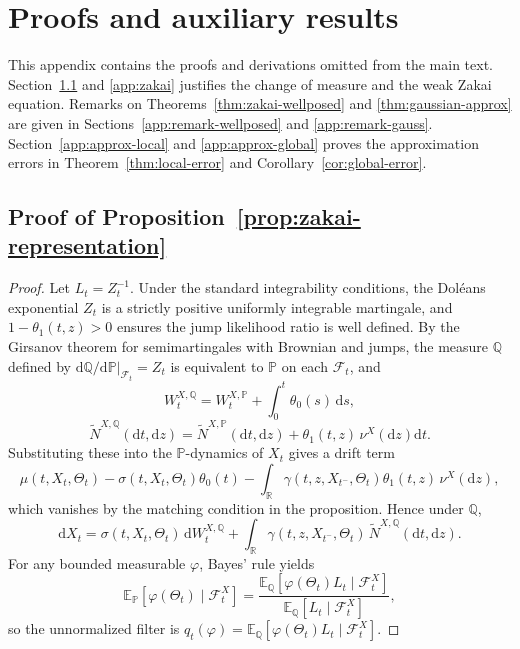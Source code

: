 \documentclass{article}
\newcommand{\dd}{\mathrm{d}}
\begin{document}



\newpage
\appendix

\section{Proofs and auxiliary results}\label{app:proof}

This appendix contains the proofs and derivations omitted from the main text. Section~\ref{app:change-measure} and \ref{app:zakai} justifies the change of measure and the weak Zakai equation. Remarks on Theorems~\ref{thm:zakai-wellposed} and \ref{thm:gaussian-approx} are given in Sections~\ref{app:remark-wellposed} and \ref{app:remark-gauss}. Section~\ref{app:approx-local} and \ref{app:approx-global} proves the approximation errors in Theorem~\ref{thm:local-error} and Corollary~\ref{cor:global-error}.

\subsection{Proof of Proposition~\ref{prop:zakai-representation}}\label{app:change-measure}
\begin{proof}
    Let \(L_t = Z_t^{-1}\). Under the standard integrability conditions, the Dol\'eans exponential \(Z_t\) is a strictly positive uniformly integrable martingale, and \(1-\theta_1(t,z)>0\) ensures the jump likelihood ratio is well defined. By the Girsanov theorem for semimartingales with Brownian and jumps, the measure \(\mathbb Q\) defined by \(\dd\mathbb Q/\dd\mathbb P|_{\mathcal F_t}=Z_t\) is equivalent to \(\mathbb P\) on each \(\mathcal F_t\), and
\[
W_t^{X,\mathbb Q} = W_t^{X,\mathbb P} + \int_0^t \theta_0(s)\,\dd s,
\]
\[
\widetilde N^{X,\mathbb Q}(\dd t,\dd z) = \widetilde N^{X,\mathbb P}(\dd t,\dd z) + \theta_1(t,z)\,\nu^X(\dd z)\dd t.
\]
Substituting these into the \(\mathbb P\)-dynamics of \(X_t\) gives a drift term
\[
\mu(t,X_t,\Theta_t) - \sigma(t,X_t,\Theta_t)\theta_0(t) - \int_{\mathbb R}\gamma(t,z,X_{t^-},\Theta_t)\theta_1(t,z)\,\nu^X(\dd z),
\]
which vanishes by the matching condition in the proposition. Hence under \(\mathbb Q\),
\[
\dd X_t = \sigma(t,X_t,\Theta_t)\,\dd W_t^{X,\mathbb Q} + \int_{\mathbb R}\gamma(t,z,X_{t^-},\Theta_t)\,\widetilde N^{X,\mathbb Q}(\dd t,\dd z).
\]
For any bounded measurable \(\varphi\), Bayes' rule yields
\[
\mathbb E_{\mathbb P}[\varphi(\Theta_t)\mid \mathcal F_t^X] = \frac{\mathbb E_{\mathbb Q}[\varphi(\Theta_t)L_t\mid \mathcal F_t^X]}{\mathbb E_{\mathbb Q}[L_t\mid \mathcal F_t^X]},
\]
so the unnormalized filter is \(q_t(\varphi) = \mathbb E_{\mathbb Q}[\varphi(\Theta_t)L_t\mid \mathcal F_t^X]\).    
\end{proof}
\end{document}
